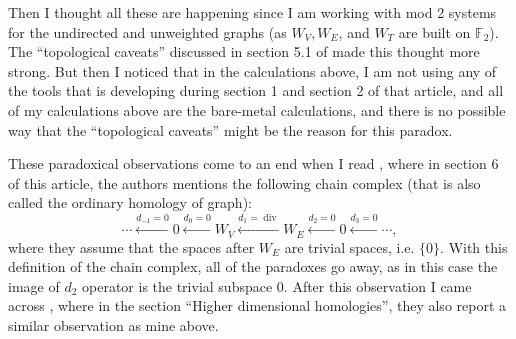 \documentclass[11pt,a4paper]{article}
\renewcommand{\div}{\operatorname{div}}
\begin{document}
	
	Then I thought all these are happening since I am working with mod 2 systems for the undirected and unweighted graphs (as $ W_V, W_E $, and $ W_T $ are built on $ \mathbb{F}_2 $). The ``topological caveats'' discussed in section 5.1 of \cite{Lim2019} made this thought more strong. But then I noticed that in the calculations above, I am not using any of the tools that \cite{Lim2019} is developing during section 1 and section 2 of that article, and all of my calculations above are the bare-metal calculations, and there is no possible way that the ``topological caveats'' might be the reason for this paradox.
	
	These paradoxical observations come to an end when I read \cite{dewan2016graph}, where in section 6 of this article, the authors mentions the following chain complex (that is also called the ordinary homology of graph):
	\[ \cdots \xleftarrow{d_{-1}=0} 0 \xleftarrow{d_{0}=0} W_V \xleftarrow{d_{1}=\div} W_E \xleftarrow{d_{2}=0} 0 \xleftarrow{d_{3}=0} \cdots, \]
	where they assume that the spaces after $ W_E $ are trivial spaces, i.e. $ \{0\} $. With this definition of the chain complex, all of the paradoxes go away, as in this case the image of $ d_2 $ operator is the trivial subspace $ 0 $. After this observation I came across \cite{Wiki2024}, where in the section ``Higher dimensional homologies'', they also report a similar observation as mine above.
	
	
	
	
	
	
	
	
	
	
	
	
	
\end{document}
